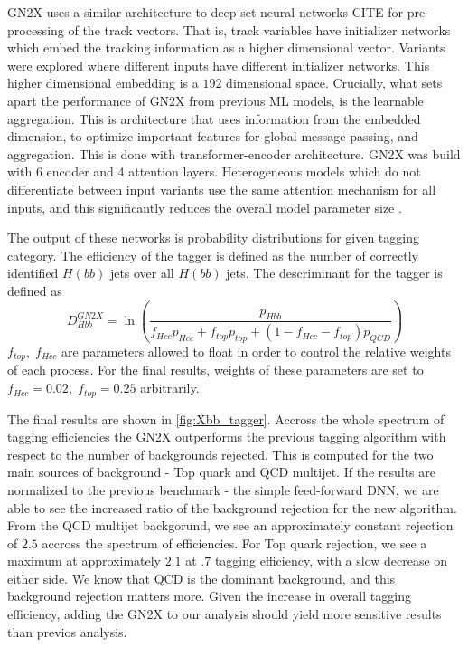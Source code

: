 \documentclass[12pt]{article}
\begin{document}
GN2X uses a similar architecture to deep set neural networks CITE for pre-processing
of the track vectors. That is, track variables have initializer networks which
embed the tracking information as a higher dimensional vector. Variants were
explored where different inputs have different initializer networks. This higher
dimensional embedding is a $192$ dimensional space. Crucially, what sets apart
the performance of GN2X from previous ML models, is the learnable aggregation.
This is architecture that uses information from the embedded dimension, to
optimize important features for global message passing, and aggregation. This is
done with transformer-encoder architecture. GN2X was build with 6 encoder and 4
attention layers. Heterogeneous models which do not differentiate between input
variants use the same attention mechanism for all inputs, and this significantly
reduces the overall model parameter size \cite{boosted_hbbcc_tagger}.

The output of these networks is probability distributions for given tagging
category. The efficiency of the tagger is defined as the number of correctly
identified $H(bb)$ jets over all $H(bb)$ jets. The descriminant for the tagger
is defined as
\begin{equation}
    D^{GN2X}_{Hbb} = \ln \left( \frac{p_{Hbb}}{ f_{Hcc}p_{Hcc} +
    f_{top}p_{top} + ( 1 - f_{Hcc} - f_{top} )p_{QCD} } \right)
\end{equation}
$f_{top},\;f_{Hcc}$ are parameters allowed to float in order to control the
relative weights of each process. For the final results, weights of these
parameters are set to $f_{Hcc} = 0.02, \; f_{top} = 0.25$ arbitrarily.

The final results are shown in \ref{fig:Xbb_tagger}. Accross the whole spectrum
of tagging efficiencies the GN2X outperforms the previous tagging algorithm with
respect to the number of backgrounds rejected. This is computed for the two main
sources of background - Top quark and QCD multijet. If the results are
normalized to the previous benchmark - the simple feed-forward DNN, we are able
to see the increased ratio of the background rejection for the new algorithm.
From the QCD multijet backgorund, we see an approximately constant rejection of
$2.5$ accross the spectrum of efficiencies. For Top quark rejection, we see a
maximum at approximately $2.1$ at $.7$ tagging efficiency, with a slow decrease on either
side. We know that QCD is the dominant background, and this background rejection
matters more. Given the increase in overall tagging efficiency, adding the GN2X
to our analysis should yield more sensitive results than previos analysis.
\end{document}
